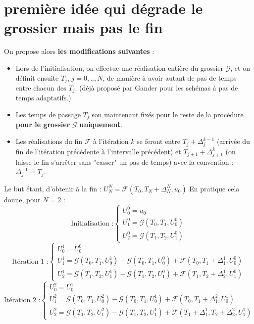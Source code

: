 \documentclass[review,onefignum,onetabnum]{siamart220329}
\newcommand{\G}{\mathcal{G}}
\newcommand{\F}{\mathcal{F}}
\begin{document}
\section{première idée qui dégrade le grossier mais pas le fin}
On propose alors \textbf{les modifications suivantes} :
\begin{itemize}
    \item Lors de l'initialisation, on effectue une réalisation entière du grossier $\G$, et on définit ensuite $T_j$, $j = 0,..,N$, de manière à avoir autant de pas de temps entre chacun des $T_j$. (déjà proposé par Gander pour les schémas à pas de temps adaptatifs.)
    \item Les temps de passage $T_j$ son maintenant fixés pour le reste de la procédure \textbf{pour le grossier}  $\G$ \textbf{uniquement}.
    \item Les réalisations du fin $\F$ à l'itération $k$ se feront entre $T_j + \Delta^{k-1}_{j}$ (arrivée du fin de l'itération précédente à l'intervalle précédent) et $T_{j+1} + \Delta^{k}_{j+1}$ (on laisse le fin s'arrêter sans "casser" un pas de temps) avec la convention : $\Delta^{-1}_{j} = T_j$.
\end{itemize}
Le but étant, d'obtenir à la fin : $U^{N}_{N} = \F(T_0,T_{N}+\Delta^{N}_{N},u_0)$
En pratique cela donne, pour $N = 2$ :
\begin{equation*}
\text{Initialisation :}
\begin{cases}
U^0_0 = u_0 \\
U^0_1 = \G(T_{0},T_{1},U^{0}_{0}) \\
U^0_2 = \G(T_{1},T_{2},U^{0}_{1})
\end{cases}
\end{equation*}
\begin{equation*}
\text{Itération 1 :}
\begin{cases}
U^1_0 = U^0_0 \\
U^1_1 = \G(T_{0},T_{1},U^{1}_{0}) - \G(T_{0},T_{1},U^{0}_{0}) + \F(T_{0},T_{1} + \Delta^1_1,U^{0}_{0}) \\
U^1_2 = \G(T_{1},T_{2},U^{1}_{1}) - \G(T_{1},T_{2},U^{0}_{1}) + \F(T_{1},T_{2} + \Delta^1_2,U^{0}_{1}) 
\end{cases}
\end{equation*}
\begin{equation*}
\text{Itération 2 :}
\begin{cases}
U^2_0 = U^1_0 \\
U^2_1 = \G(T_{0},T_{1},U^{2}_{0}) - \G(T_{0},T_{1},U^{1}_{0}) + \F(T_{0},T_{1} + \Delta^2_1,U^{1}_{0}) \\
U^2_2 = \G(T_{1},T_{2},U^{2}_{1}) - \G(T_{1},T_{2},U^{1}_{1}) + \F(T_{1} + \Delta^1_1 ,T_{2} + \Delta^2_2,U^{1}_{1}) 
\end{cases}
\end{equation*}
\end{document}

